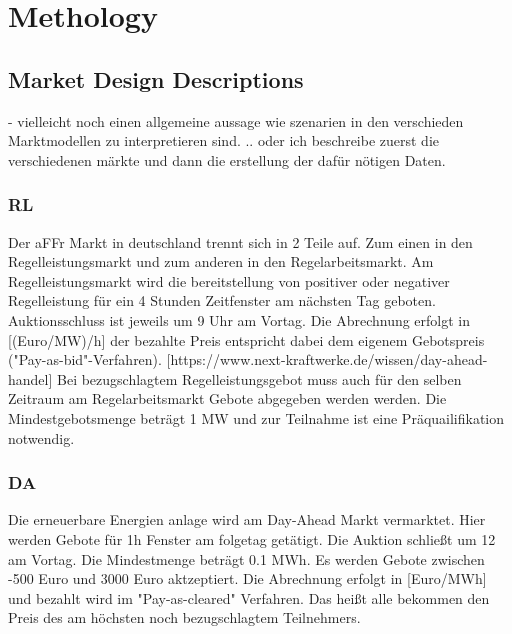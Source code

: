 \chapter{Methology}
\section{Market Design Descriptions}

- vielleicht noch einen allgemeine aussage wie szenarien in den verschieden Marktmodellen zu interpretieren sind.
.. oder ich beschreibe zuerst die verschiedenen märkte und dann die erstellung der dafür nötigen Daten.

\subsection{RL}
Der aFFr Markt in deutschland trennt sich in 2 Teile auf. Zum einen in den Regelleistungsmarkt und zum anderen in den Regelarbeitsmarkt.
Am Regelleistungsmarkt wird die bereitstellung von positiver oder negativer Regelleistung für ein 4 Stunden Zeitfenster am nächsten Tag geboten.
Auktionsschluss ist jeweils um 9 Uhr am Vortag.
Die Abrechnung erfolgt in [(Euro/MW)/h] der bezahlte Preis entspricht dabei dem eigenem Gebotspreis ("Pay-as-bid"-Verfahren).
	[https://www.next-kraftwerke.de/wissen/day-ahead-handel]
Bei bezugschlagtem Regelleistungsgebot muss auch für den selben Zeitraum am Regelarbeitsmarkt Gebote abgegeben werden werden.
Die Mindestgebotsmenge beträgt 1 MW und zur Teilnahme ist eine Präquailifikation notwendig.

\subsection{DA}
Die erneuerbare Energien anlage wird am Day-Ahead Markt vermarktet. Hier werden Gebote für 1h Fenster am folgetag getätigt.
Die Auktion schließt um 12 am Vortag. Die Mindestmenge beträgt 0.1 MWh. Es werden Gebote zwischen -500 Euro und 3000 Euro aktzeptiert.
Die Abrechnung erfolgt in [Euro/MWh] und bezahlt wird im "Pay-as-cleared" Verfahren.
Das heißt alle bekommen den Preis des am höchsten noch bezugschlagtem Teilnehmers.

